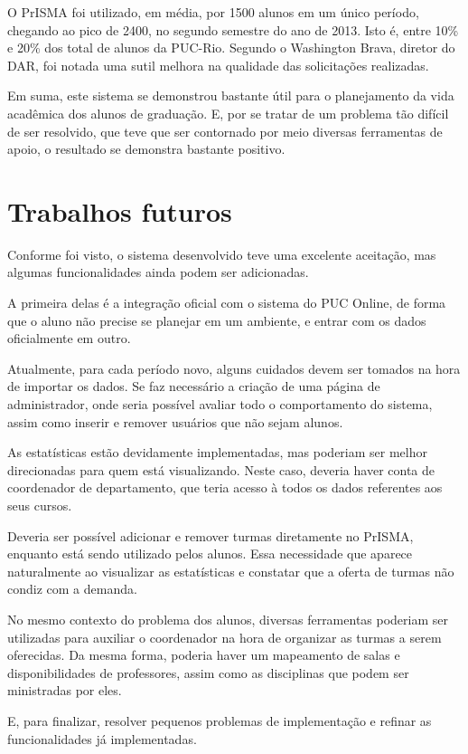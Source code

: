 \documentclass[graduacao,brazil]{ThesisPUC}
\begin{document}
O PrISMA foi utilizado, em média, por 1500 alunos em um único período, chegando ao pico de 2400, no segundo semestre do ano de 2013. Isto é, entre 10\% e 20\% dos total de alunos da PUC-Rio. Segundo o Washington Brava, diretor do DAR, foi notada uma sutil melhora na qualidade das solicitações realizadas.

Em suma, este sistema se demonstrou bastante útil para o planejamento da vida acadêmica dos alunos de graduação. E, por se tratar de um problema tão difícil de ser resolvido, que teve que ser contornado por meio diversas ferramentas de apoio, o resultado se demonstra bastante positivo.


\chapter{Trabalhos futuros}

Conforme foi visto, o sistema desenvolvido teve uma excelente aceitação, mas algumas funcionalidades ainda podem ser adicionadas.

A primeira delas é a integração oficial com o sistema do PUC Online, de forma que o aluno não precise se planejar em um ambiente, e entrar com os dados oficialmente em outro.

Atualmente, para cada período novo, alguns cuidados devem ser tomados na hora de importar os dados. Se faz necessário a criação de uma página de administrador, onde seria possível avaliar todo o comportamento do sistema, assim como inserir e remover usuários que não sejam alunos.

As estatísticas estão devidamente implementadas, mas poderiam ser melhor direcionadas para quem está visualizando. Neste caso, deveria haver conta de coordenador de departamento, que teria acesso à todos os dados referentes aos seus cursos.

Deveria ser possível adicionar e remover turmas diretamente no PrISMA, enquanto está sendo utilizado pelos alunos. Essa necessidade que aparece naturalmente ao visualizar as estatísticas e constatar que a oferta de turmas não condiz com a demanda.

No mesmo contexto do problema dos alunos, diversas ferramentas poderiam ser utilizadas para auxiliar o coordenador na hora de organizar as turmas a serem oferecidas. Da mesma forma, poderia haver um mapeamento de salas e disponibilidades de professores, assim como as disciplinas que podem ser ministradas por eles.

E, para finalizar, resolver pequenos problemas de implementação e refinar as funcionalidades já implementadas.
\end{document}
